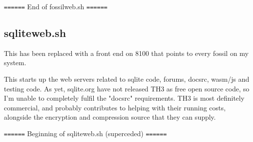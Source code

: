 \documentclass[11pt]{article}
\begin{document}
\texttt{======} End of fossilweb.sh \texttt{======}

\subsection*{sqliteweb.sh}
\label{sec:orgdcb7d03}

This has been replaced with a front end on 8100 that points to every fossil on my system.

This starts up the web servers related to sqlite code, forums, docsrc, wasm/js and testing code. As
yet, sqlite.org have not released TH3 as free open source code, so I'm unable to completely fulfil
the "docsrc" requirements. TH3 is most definitely commercial, and probably contributes to helping
with their running costs, alongside the encryption and compression source that they can supply.

\texttt{======} Beginning of sqliteweb.sh (superceded) \texttt{======}
\end{document}
